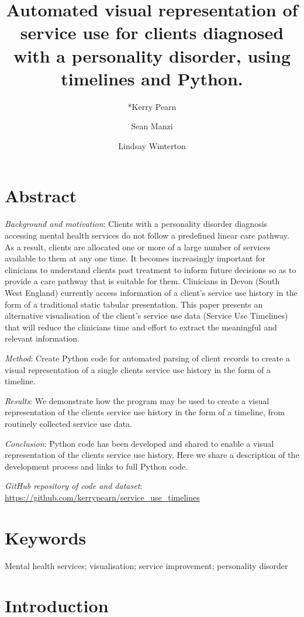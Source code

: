 \documentclass{article}
\title{Automated visual representation of service use for clients diagnosed with a personality disorder, using timelines and Python.\\
\vspace{0.5cm}
}
\author[1]{*Kerry Pearn}
\author[1]{Sean Manzi}
\author[2]{Lindsay Winterton}
\affil[1,*]{\footnotesize University of Exeter Medical School \& NIHR South West Peninsula Applied Research Collaboration (ARC).}
\affil[2]{\footnotesize Devon Partnership Trust, National Health Service, UK}
\affil[*]{\footnotesize Corresponding author: k.pearn@exeter.ac.uk}
\begin{document}
\maketitle

\section*{Abstract} 

\emph{Background and motivation}: Clients with a personality disorder diagnosis accessing mental health services do not follow a predefined linear care pathway. As a result, clients are allocated one or more of a large number of services available to them at any one time. It becomes increasingly important for clinicians to understand clients past treatment to inform future decisions so as to provide a care pathway that is suitable for them. Clinicians in Devon (South West England) currently access information of a client’s service use history in the form of a traditional static tabular presentation. This paper presents an alternative visualisation of the client’s service use data (Service Use Timelines) that will reduce the clinicians time and effort to extract the meaningful and relevant information.

\emph{Method}: Create Python code for automated parsing of client records to create a visual representation of a single clients service use history in the form of a timeline.

\emph{Results}: We demonstrate how the program may be used to create a visual representation of the clients service use history in the form of a timeline, from routinely collected service use data.

\emph{Conclusion}: Python code has been developed and shared to enable a visual representation of the clients service use history. Here we share a description of the development process and links to full Python code.

\emph{GitHub repository of code and dataset}: \url{https://github.com/kerrypearn/service_use_timelines}

\section*{Keywords}
Mental health services; visualisation; service improvement; personality disorder

\section{Introduction}
\end{document}
